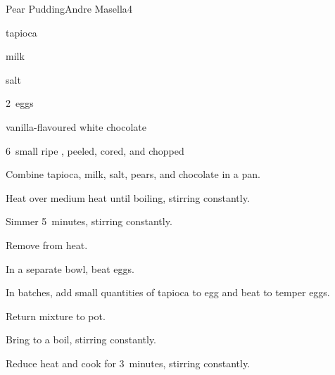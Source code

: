 \begin{recipe}{Pear Pudding}{Andre Masella}{4}

\begin{ingredients}
\item \C{\half} tapioca
\item {} milk
\item \tp{\quarter} salt
\item 2~eggs
\item {} vanilla-flavoured white chocolate
\item 6~small ripe , peeled, cored, and chopped
\end{ingredients}

\begin{directions}
\item Combine tapioca, milk, salt, pears, and chocolate in a pan.
\item Heat over medium heat until boiling, stirring constantly.
\item Simmer 5~minutes, stirring constantly.
\item Remove from heat.
\item In a separate bowl, beat eggs.
\item In batches, add small quantities of tapioca to egg and beat to temper eggs.
\item Return mixture to pot.
\item Bring to a boil, stirring constantly.
\item Reduce heat and cook for 3~minutes, stirring constantly.
\end{directions}

\end{recipe}
